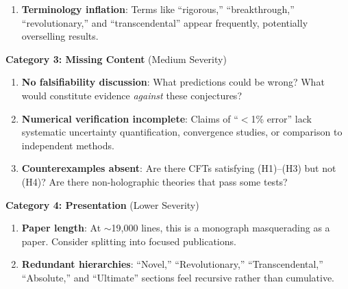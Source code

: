 \documentclass[12pt,a4paper]{article}
\begin{document}
\begin{tcolorbox}[colback=red!5!white, colframe=red!75!black, title=\textbf{RED TEAM: Critical Issues (Severity-Ranked)}]
\begin{enumerate}[resume, label=\textbf{R\arabic*.}]
    \item \textbf{Terminology inflation}: Terms like ``rigorous,'' ``breakthrough,'' ``revolutionary,'' and ``transcendental'' appear frequently, potentially overselling results.
\end{enumerate}

\textbf{Category 3: Missing Content} (\textcolor{yellow!80!black}{Medium Severity})
\begin{enumerate}[resume, label=\textbf{R\arabic*.}]
    \item \textbf{No falsifiability discussion}: What predictions could be wrong? What would constitute evidence \emph{against} these conjectures?
    
    \item \textbf{Numerical verification incomplete}: Claims of ``$<$1\% error'' lack systematic uncertainty quantification, convergence studies, or comparison to independent methods.
    
    \item \textbf{Counterexamples absent}: Are there CFTs satisfying (H1)--(H3) but not (H4)? Are there non-holographic theories that pass some tests?
\end{enumerate}

\textbf{Category 4: Presentation} (\textcolor{green!50!black}{Lower Severity})
\begin{enumerate}[resume, label=\textbf{R\arabic*.}]
    \item \textbf{Paper length}: At $\sim$19,000 lines, this is a monograph masquerading as a paper. Consider splitting into focused publications.
    
    \item \textbf{Redundant hierarchies}: ``Novel,'' ``Revolutionary,'' ``Transcendental,'' ``Absolute,'' and ``Ultimate'' sections feel recursive rather than cumulative.
\end{enumerate}
\end{tcolorbox}

\vspace{1em}
\end{document}
